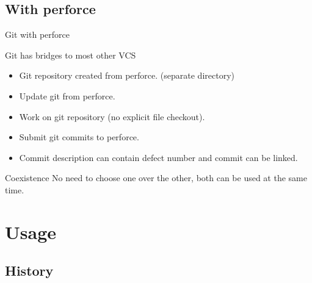 \documentclass{beamer}
\begin{document}

\subsection{With perforce}

\begin{frame}{Git with perforce}

\begin{block}{Git has bridges to most other VCS}
\begin{itemize}
 \item Git repository created from perforce. (separate directory)
 \item Update git from perforce.
 \item Work on git repository (no explicit file checkout).
 \item Submit git commits to perforce.
 \item Commit description can contain defect number and commit can be linked.
\end{itemize}
\end{block}

\begin{exampleblock}{Coexistence}
No need to choose one over the other, both can be used at the same time.
\end{exampleblock}

\end{frame}


\section{Usage}

\subsection{History}
\end{document}
